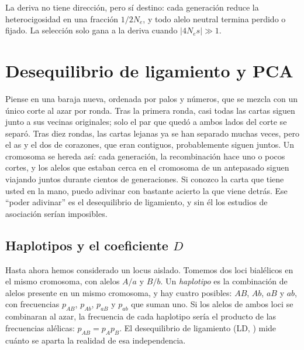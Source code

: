 \begin{ideaclave}
La deriva no tiene dirección, pero sí destino: cada generación reduce la heterocigosidad en una fracción $1/2N_e$, y todo alelo neutral termina perdido o fijado. La selección solo gana a la deriva cuando $|4N_es|\gg1$.
\end{ideaclave}

\section{Desequilibrio de ligamiento y PCA}\label{sec:10-ld}

\begin{intuicion}
Piense en una baraja nueva, ordenada por palos y números, que se mezcla con un único corte al azar por ronda. Tras la primera ronda, casi todas las cartas siguen junto a sus vecinas originales; solo el par que quedó a ambos lados del corte se separó. Tras diez rondas, las cartas lejanas ya se han separado muchas veces, pero el as y el dos de corazones, que eran contiguos, probablemente siguen juntos. Un cromosoma se hereda así: cada generación, la recombinación hace uno o pocos cortes, y los alelos que estaban cerca en el cromosoma de un antepasado siguen viajando juntos durante cientos de generaciones. Si conozco la carta que tiene usted en la mano, puedo adivinar con bastante acierto la que viene detrás. Ese ``poder adivinar'' es el desequilibrio de ligamiento, y sin él los estudios de asociación serían imposibles.
\end{intuicion}

\subsection{Haplotipos y el coeficiente \texorpdfstring{$D$}{D}}

Hasta ahora hemos considerado un locus aislado. Tomemos dos loci bialélicos en el mismo cromosoma, con alelos $A/a$ y $B/b$. Un \emph{haplotipo} es la combinación de alelos presente en un mismo cromosoma, y hay cuatro posibles: $AB$, $Ab$, $aB$ y $ab$, con frecuencias $p_{AB}$, $p_{Ab}$, $p_{aB}$ y $p_{ab}$ que suman uno. Si los alelos de ambos loci se combinaran al azar, la frecuencia de cada haplotipo sería el producto de las frecuencias alélicas: $p_{AB}=p_Ap_B$. El desequilibrio de ligamiento (LD, ) mide cuánto se aparta la realidad de esa independencia.

